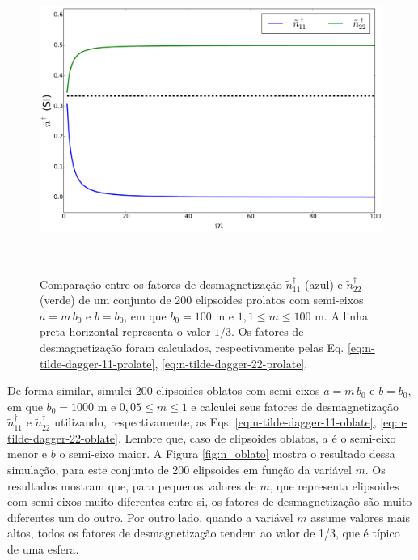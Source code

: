 \begin{figure}[hbt!]
	\centering \includegraphics[width=15cm,height=10cm]{figures/test_n_prolate}
	\caption[Comparação entre os fatores de desmagnetização $\tilde{n}^{\dagger}_{11}$ (azul) e $\tilde{n}^{\dagger}_{22}$ (verde) de um conjunto de 200 elipsoides prolatos com semi-eixos $a=m\, b_0$ e $b=b_0$, em que $b_0=100$ m e $1,1 \le m \le 100$ m. A linha preta horizontal representa o valor $1/3$. Os fatores de desmagnetização foram calculados, respectivamente pelas Eq. \ref{eq:n-tilde-dagger-11-prolate}, \ref{eq:n-tilde-dagger-22-prolate}.]{Comparação entre os fatores de desmagnetização $\tilde{n}^{\dagger}_{11}$ (azul) e $\tilde{n}^{\dagger}_{22}$ (verde) de um conjunto de 200 elipsoides prolatos com semi-eixos $a=m\, b_0$ e $b=b_0$, em que $b_0=100$ m e $1,1 \le m \le 100$ m. A linha preta horizontal representa o valor $1/3$. Os fatores de desmagnetização foram calculados, respectivamente pelas Eq. \ref{eq:n-tilde-dagger-11-prolate}, \ref{eq:n-tilde-dagger-22-prolate}.}
	\label{fig:n_prolato}
\end{figure}

De forma similar, simulei 200 elipsoides oblatos com semi-eixos $a=m\, b_0$ e $b=b_0$, em que $b_0=1000$ m e $0,05 \le m \le 1$ e calculei seus fatores de desmagnetização $\tilde{n}^{\dagger}_{11}$ e $\tilde{n}^{\dagger}_{22}$ utilizando, respectivamente, as Eqs. \ref{eq:n-tilde-dagger-11-oblate}, \ref{eq:n-tilde-dagger-22-oblate}. Lembre que, caso de elipsoides oblatos, $a$ é o semi-eixo menor e $b$ o semi-eixo maior. A Figura \ref{fig:n_oblato} mostra o resultado dessa simulação, para este conjunto de 200 elipsoides em função da variável $m$. Os resultados mostram que, para pequenos valores de $m$, que representa elipsoides com semi-eixos muito diferentes entre si, os fatores de desmagnetização são muito diferentes um do outro. Por outro lado, quando a variável $m$ assume valores mais altos, todos os fatores de desmagnetização tendem ao valor de 1/3, que é típico de uma esfera.\\

